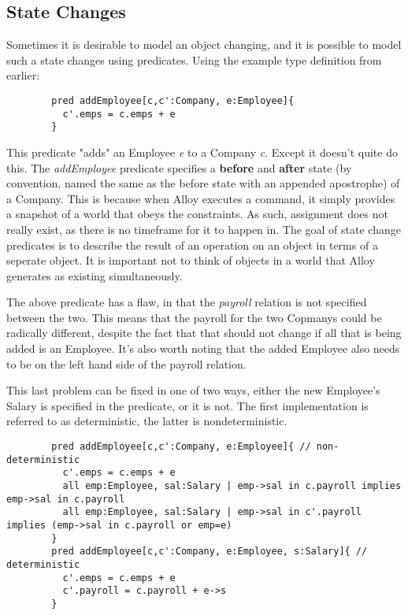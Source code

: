 \documentclass[10pt]{article}
\begin{document}
    \subsection*{State Changes}
      Sometimes it is desirable to model an object changing, and it is possible to model such a state changes using predicates. Using the example type definition from earlier:
      \begin{lstlisting}
        pred addEmployee[c,c':Company, e:Employee]{
          c'.emps = c.emps + e
        }
      \end{lstlisting}\par
      This predicate "adds" an Employee \textit{e} to a Company \textit{c}. Except it doesn't quite do this. The \textit{addEmployee} predicate specifies a \textbf{before} and \textbf{after} state (by convention, named the same as the before state with an appended apostrophe) of a Company. This is because when Alloy executes a command, it simply provides a snapshot of a world that obeys the constraints. As such, assignment does not really exist, as there is no timeframe for it to happen in. The goal of state change predicates is to describe the result of an operation on an object in terms of a seperate object. It is important not to think of objects in a world that Alloy generates as existing simultaneously.\par
      The above predicate has a flaw, in that the \textit{payroll} relation is not specified between the two. This means that the payroll for the two Copmanys could be radically different, despite the fact that that should not change if all that is being added is an Employee. It's also worth noting that the added Employee also needs to be on the left hand side of the payroll relation.\par
      This last problem can be fixed in one of two ways, either the new Employee's Salary is specified in the predicate, or it is not. The first implementation is referred to as deterministic, the latter is nondeterministic.
      \begin{lstlisting}
        pred addEmployee[c,c':Company, e:Employee]{ // non-deterministic
          c'.emps = c.emps + e
          all emp:Employee, sal:Salary | emp->sal in c.payroll implies emp->sal in c.payroll
          all emp:Employee, sal:Salary | emp->sal in c'.payroll implies (emp->sal in c.payroll or emp=e)
        }
        pred addEmployee[c,c':Company, e:Employee, s:Salary]{ // deterministic
          c'.emps = c.emps + e
          c'.payroll = c.payroll + e->s
        }
      \end{lstlisting}\par
\end{document}
